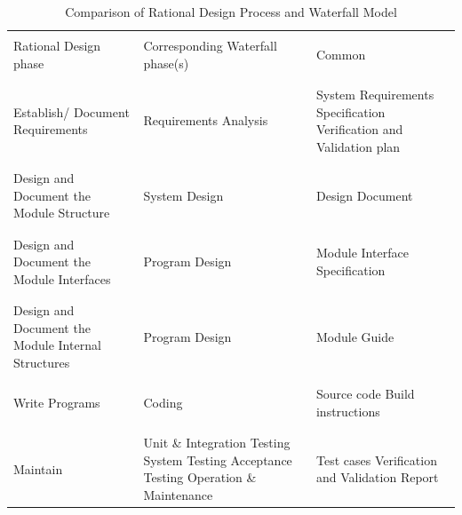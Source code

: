 \begin{table}[htbp]
\caption{Comparison of Rational Design Process and Waterfall Model}
\label{tab:RatWatComp}
\begin{tabular}{|p{.25\linewidth}|p{.35\linewidth}|p{.4\linewidth}|}
\hline &&\\
Rational Design phase & Corresponding Waterfall phase(s) & Common \SFS{}
\\&&\\ \hline &&\\
	Establish/ Document Requirements & Requirements Analysis & System 
	Requirements Specification \newline \newline
	Verification and Validation plan
\\&&\\ \hline &&\\
	Design and Document the Module Structure & 
	System Design  & 
	Design Document
\\&&\\ \hline &&\\
	Design and Document the Module Interfaces & 
	Program Design & 
	Module Interface Specification
\\&&\\ \hline &&\\
	Design and Document the Module Internal Structures &
	Program Design &
	Module Guide
\\&&\\ \hline &&\\
	Write Programs & 
	Coding &
	Source code  \newline \newline
	Build instructions
\\&&\\ \hline &&\\
	Maintain & 
	Unit \& Integration Testing \newline \newline System Testing \newline 
	\newline Acceptance 
	Testing \newline \newline Operation \& Maintenance &
	Test cases \newline \newline
	Verification and Validation Report
\\ \hline
\end{tabular}
\end{table}

